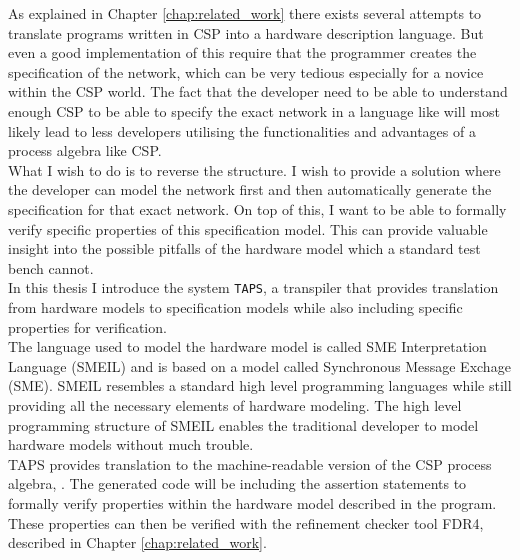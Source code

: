 %



As explained in Chapter \ref{chap:related_work} there exists several attempts to translate programs written in CSP into a hardware description language. But even a good implementation of this require that the programmer creates the specification of the network, which can be very tedious especially for a novice within the CSP world. The fact that the developer need to be able to understand enough CSP to be able to specify the exact network in a language like \cspm{} will most likely lead to less developers utilising the functionalities and advantages of a process algebra like CSP.\\

What I wish to do is to reverse the structure. I wish to provide a solution where the developer can model the network first and then automatically generate the specification for that exact network. On top of this, I want to be able to formally verify specific properties of this specification model. This can provide valuable insight into the possible pitfalls of the hardware model which a standard test bench cannot.\\

In this thesis I introduce the system \texttt{TAPS}, a transpiler that provides translation from hardware models to specification models while also including specific properties for verification.\\

The language used to model the hardware model is called SME Interpretation Language (SMEIL) and is based on a model called Synchronous Message Exchage (SME). SMEIL resembles a standard high level programming languages while still providing all the necessary elements of hardware modeling. The high level programming structure of SMEIL enables the traditional developer to model hardware models without much trouble. \\

TAPS provides translation to the machine-readable version of the CSP process algebra, \cspm{}. The generated \cspm{} code will be including the assertion statements to formally verify properties within the hardware model described in the \cspm{} program. These properties can then be verified with the \cspm{} refinement checker tool FDR4, described in Chapter \ref{chap:related_work}.


